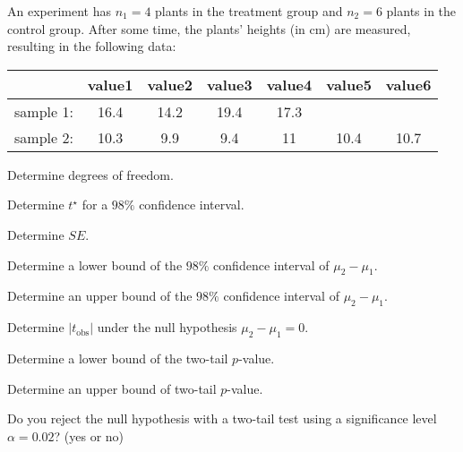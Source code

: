 
\begin{question}
An experiment has \(n_1 = 4\) plants in the treatment group and
\(n_2 = 6\) plants in the control group. After some time, the plants'
heights (in cm) are measured, resulting in the following data:

\begin{longtable}[]{@{}ccccccc@{}}
\toprule
& value1 & value2 & value3 & value4 & value5 & value6\tabularnewline
\midrule
\endhead
sample 1: & 16.4 & 14.2 & 19.4 & 17.3\tabularnewline
sample 2: & 10.3 & 9.9 & 9.4 & 11 & 10.4 & 10.7\tabularnewline
\bottomrule
\end{longtable}
\begin{answerlist}
  \item Determine degrees of freedom.
  \item Determine \(t^\star\) for a \(98\%\) confidence interval.
  \item Determine \(SE\).
  \item Determine a lower bound of the \(98\%\) confidence interval of
\(\mu_2-\mu_1\).
  \item Determine an upper bound of the \(98\%\) confidence interval of
\(\mu_2-\mu_1\).
  \item Determine \(|t_\text{obs}|\) under the null hypothesis
\(\mu_2-\mu_1=0\).
  \item Determine a lower bound of the two-tail \(p\)-value.
  \item Determine an upper bound of two-tail \(p\)-value.
  \item Do you reject the null hypothesis with a two-tail test using a
significance level \(\alpha = 0.02\)? (yes or no)
\end{answerlist}
\end{question}

